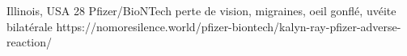           {Illinois, USA}
          {28}
          {Pfizer/BioNTech}
          {}
          {perte de vision, migraines, oeil gonflé, uvéite bilatérale}
          {https://nomoresilence.world/pfizer-biontech/kalyn-ray-pfizer-adverse-reaction/}
